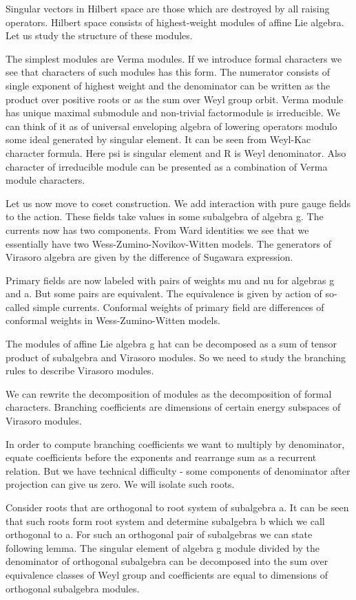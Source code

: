 \documentclass[a4paper]{article}
\begin{document}
Singular vectors in Hilbert space are those which are destroyed by all raising operators. Hilbert space consists of highest-weight modules of affine Lie algebra. Let us study the structure of these modules. 

The simplest modules are Verma modules. If we introduce formal characters we see that characters of such modules has this form. The numerator consists of single exponent of highest weight and the denominator can be written as the product over positive roots or as the sum over Weyl group orbit. Verma module has unique maximal submodule and non-trivial factormodule is irreducible. We can think of it as of universal enveloping algebra of lowering operators modulo some ideal generated by singular element. 
It can be seen from Weyl-Kac character formula. Here psi is singular element and R is Weyl denominator. Also character of irreducible module can be presented as a combination of Verma module characters. 

Let us now move to coset construction. We add interaction with pure gauge fields to the action. These fields take values in some subalgebra of algebra g. The currents now has two components. From Ward identities we see that we essentially have two Wess-Zumino-Novikov-Witten models. The generators of Virasoro algebra are given by the difference of Sugawara expression. 

Primary fields are now labeled with pairs of weights mu and nu for algebras g and a. But some pairs are equivalent. The equivalence is given by action of so-called simple currents. Conformal weights of primary field are differences of conformal weights in Wess-Zumino-Witten models. 

The modules of affine Lie algebra g hat can be decomposed as a sum of tensor product of subalgebra and Virasoro modules. So we need to study the branching rules to describe Virasoro modules. 

We can rewrite the decomposition of modules as the decomposition of formal characters. Branching coefficients are dimensions of certain energy subspaces of Virasoro modules. 

In order to compute branching coefficients we want to multiply by denominator, equate coefficients before the exponents and rearrange sum  as a recurrent relation. But we have technical difficulty - some components of denominator after projection can give us zero. We will isolate such roots. 

Consider roots that are orthogonal to root system of subalgebra a. It can be seen that such roots form root system and determine subalgebra b which we call orthogonal to a. For such an orthogonal pair of subalgebras we can state following lemma. The singular element of algebra g module divided by the denominator of orthogonal subalgebra can be decomposed into the sum over equivalence classes of Weyl group and coefficients are equal to dimensions of orthogonal subalgebra modules. 
\end{document}
